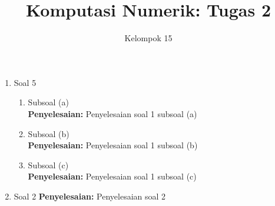 \documentclass{article}
\title{\textbf{Komputasi Numerik: Tugas 2}}
\author{Kelompok 15}
\date{}
\newcommand{\penyelesaian}{\textbf{Penyelesaian: }}
\begin{document}
\maketitle

\begin{enumerate}
    \item Soal 5
    \begin{enumerate}
        \item Subsoal (a) \\
        \penyelesaian Penyelesaian soal 1 subsoal (a)

        \item Subsoal (b) \\
        \penyelesaian Penyelesaian soal 1 subsoal (b)

        \item Subsoal (c) \\
        \penyelesaian  Penyelesaian soal 1 subsoal (c)
    \end{enumerate}

    \item Soal 2
    \penyelesaian Penyelesaian soal 2
\end{enumerate}
\end{document}
